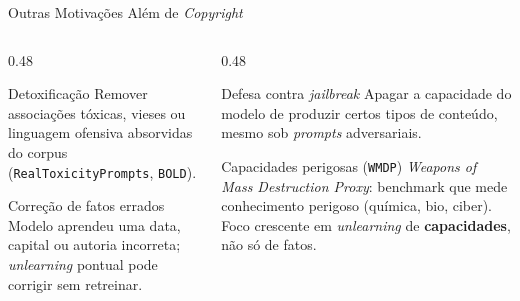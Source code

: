 \documentclass[aspectratio=169,xcolor=dvipsnames]{beamer}
\begin{document}
  \begin{frame}{Outras Motivações Além de \textit{Copyright}}
    \begin{columns}[T]
      \begin{column}{0.48\textwidth}
        \begin{block}{Detoxificação}
          Remover associações tóxicas, vieses ou linguagem ofensiva absorvidas do corpus (\texttt{RealToxicityPrompts}, \texttt{BOLD}).
        \end{block}
        \begin{block}{Correção de fatos errados}
          Modelo aprendeu uma data, capital ou autoria incorreta; \textit{unlearning} pontual pode corrigir sem retreinar.
        \end{block}
      \end{column}
      \begin{column}{0.48\textwidth}
        \begin{block}{Defesa contra \textit{jailbreak}}
          Apagar a capacidade do modelo de produzir certos tipos de conteúdo, mesmo sob \textit{prompts} adversariais.
        \end{block}
        \begin{alertblock}{Capacidades perigosas (\texttt{WMDP})}
          \textit{Weapons of Mass Destruction Proxy}: benchmark que mede conhecimento perigoso (química, bio, ciber). Foco crescente em \textit{unlearning} de \textbf{capacidades}, não só de fatos.
        \end{alertblock}
      \end{column}
    \end{columns}
  \end{frame}
\end{document}
